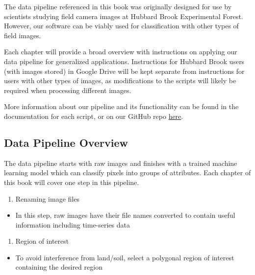 \documentclass[
]{article}
\providecommand{\tightlist}{%
  \setlength{\itemsep}{0pt}\setlength{\parskip}{0pt}}
\begin{document}
The data pipeline referenced in this book was originally designed for use by scientists studying field camera images at Hubbard Brook Experimental Forest. However, our software can be viably used for classification with other types of field images.

Each chapter will provide a broad overview with instructions on applying our data pipeline for generalized applications. Instructions for Hubbard Brook users (with images stored)
in Google Drive will be kept separate from instructions for users with other types of images,
as modifications to the scripts will likely be required when processing different images.

More information about our pipeline and its functionality can be found in the documentation
for each script, or on our GitHub repo \href{https://github.com/audreythellman/hbwater_cameratrap_pheno}{here}.

\hypertarget{data-pipeline-overview}{%
\subsection{Data Pipeline Overview}\label{data-pipeline-overview}}

The data pipeline starts with raw images and finishes with a trained machine learning model
which can classify pixels into groups of attributes. Each chapter of this book will
cover one step in this pipeline.

\begin{enumerate}
\def\labelenumi{\arabic{enumi}.}
\tightlist
\item
  Renaming image files
\end{enumerate}

\begin{itemize}
\tightlist
\item
  In this step, raw images have their file names converted to contain useful information
  including time-series data
\end{itemize}

\begin{enumerate}
\def\labelenumi{\arabic{enumi}.}
\setcounter{enumi}{1}
\tightlist
\item
  Region of interest
\end{enumerate}

\begin{itemize}
\tightlist
\item
  To avoid interference from land/soil, select a polygonal region of interest containing
  the desired region
\end{itemize}
\end{document}
